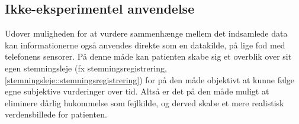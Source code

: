 \subsection{Ikke-eksperimentel anvendelse}
Udover muligheden for at vurdere sammenhænge mellem det indsamlede data kan informationerne også anvendes direkte som en datakilde, på lige fod med telefonens sensorer.
På denne måde kan patienten skabe sig et overblik over sit egen stemningsleje (fx stemningsregistrering, \cref{stemningsleje::stemningsregistrering}) for på den måde objektivt at kunne følge egne subjektive vurderinger over tid.
Altså er det på den måde muligt at eliminere dårlig hukommelse som fejlkilde, og derved skabe et mere realistisk verdensbillede for patienten.
